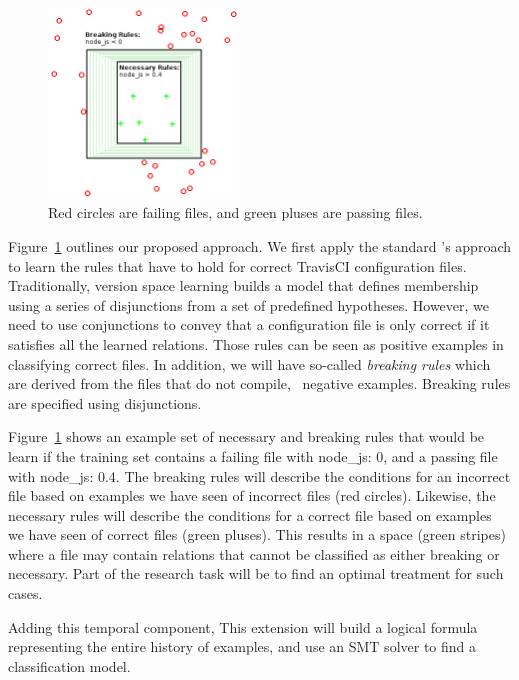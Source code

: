 \begin{figure}
  \includegraphics[width=0.45\textwidth]{figs/Version_space}
  \caption{\small Red circles are failing files, and green pluses are passing files.}
  \label{fig:versionSL}
\end{figure}

Figure~\ref{fig:versionSL} outlines our proposed approach. We first apply the standard \app's approach to learn the rules that have 
to hold for correct TravisCI configuration files. Traditionally, 
version space learning builds a model that defines membership using a series of 
disjunctions from a set of predefined hypotheses.  However, we need  to 
use conjunctions to convey that a configuration file is only correct if 
it satisfies all the learned relations. Those rules can be seen as
positive examples in classifying correct files. In addition, we will have
so-called {\emph {breaking rules}} which are derived from the files 
that do not compile, \ie~negative examples. Breaking rules are specified 
using disjunctions.

Figure~\ref{fig:versionSL} shows an example set of necessary and breaking rules that would be learn if the training set contains a failing file with {\small node\_js: 0}, and a passing file with {\small node\_js: 0.4.}
The breaking rules will describe the conditions for an incorrect file based on examples we have seen of incorrect files (red circles).
Likewise, the necessary rules will describe the conditions for a correct file based on examples we have seen of correct files (green pluses).
This results in a space (green stripes) where a file may contain relations that cannot be classified as either breaking or necessary.
Part of the research task will be to find an optimal treatment for such cases.

 Adding this temporal component, 
This extension will build a logical formula representing the entire 
history of examples, and use an SMT solver to find a classification model.

